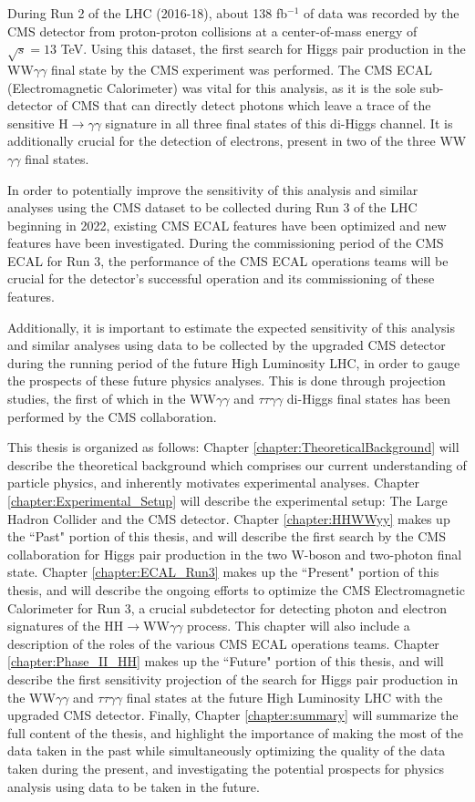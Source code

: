 During Run 2 of the LHC (2016-18), about 138 fb$^{-1}$ of data was recorded by the CMS detector from proton-proton collisions at a center-of-mass energy of $\sqrt{s}=13$ TeV. Using this dataset, the first search for Higgs pair production in the WW$\gamma\gamma$ final state by the CMS experiment was performed. The CMS ECAL (Electromagnetic Calorimeter) was vital for this analysis, as it is the sole sub-detector of CMS that can directly detect photons which leave a trace of the sensitive H$\rightarrow\gamma\gamma$ signature in all three final states of this di-Higgs channel. It is additionally crucial for the detection of electrons, present in two of the three WW$\gamma\gamma$ final states. 

In order to potentially improve the sensitivity of this analysis and similar analyses using the CMS dataset to be collected during Run 3 of the LHC beginning in 2022, existing CMS ECAL features have been optimized and new features have been investigated. During the commissioning period of the CMS ECAL for Run 3, the performance of the CMS ECAL operations teams will be crucial for the detector's successful operation and its commissioning of these features.

Additionally, it is important to estimate the expected sensitivity of this analysis and similar analyses using data to be collected by the upgraded CMS detector during the running period of the future High Luminosity LHC, in order to gauge the prospects of these future physics analyses. This is done through projection studies, the first of which in the WW$\gamma\gamma$ and $\tau\tau\gamma\gamma$ di-Higgs final states has been performed by the CMS collaboration.

This thesis is organized as follows: Chapter \ref{chapter:TheoreticalBackground} will describe the theoretical background which comprises our current understanding of particle physics, and inherently motivates experimental analyses. Chapter \ref{chapter:Experimental_Setup} will describe the experimental setup: The Large Hadron Collider and the CMS detector. Chapter \ref{chapter:HHWWyy} makes up the ``Past" portion of this thesis, and will describe the first search by the CMS collaboration for Higgs pair production in the two W-boson and two-photon final state. Chapter \ref{chapter:ECAL_Run3} makes up the ``Present" portion of this thesis, and will describe the ongoing efforts to optimize the CMS Electromagnetic Calorimeter for Run 3, a crucial subdetector for detecting photon and electron signatures of the HH$\rightarrow$WW$\gamma\gamma$ process. This chapter will also include a description of the roles of the various CMS ECAL operations teams. Chapter \ref{chapter:Phase_II_HH} makes up the ``Future" portion of this thesis, and will describe the first sensitivity projection of the search for Higgs pair production in the WW$\gamma\gamma$ and $\tau\tau\gamma\gamma$ final states at the future High Luminosity LHC with the upgraded CMS detector. Finally, Chapter \ref{chapter:summary} will summarize the full content of the thesis, and highlight the importance of making the most of the data taken in the past while simultaneously optimizing the quality of the data taken during the present, and investigating the potential prospects for physics analysis using data to be taken in the future. 